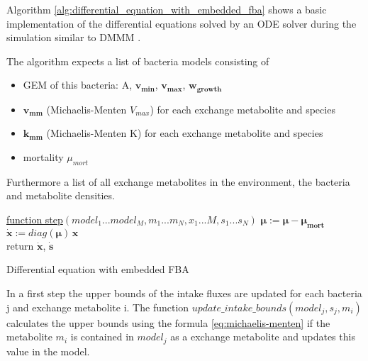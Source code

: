 Algorithm \ref{alg:differential_equation_with_embedded_fba} shows a basic implementation of the differential equations solved by an ODE
solver during the simulation similar to DMMM \cite{zhuang_genome-scale_2011}.

The algorithm expects a list of bacteria models consisting of
\begin{itemize}
 \item GEM of this bacteria: A, $\bm{v_{min}}$, $\bm{v_{max}}$, $\bm{w_{growth}}$
 \item $\bm{v_{mm}}$ (Michaelis-Menten $V_{max}$) for each exchange metabolite and species
 \item $\bm{k_{mm}}$ (Michaelis-Menten K) for each exchange metabolite and species
 \item mortality $\mu_{mort}$
\end{itemize}

Furthermore a list of all exchange metabolites in the environment, the bacteria and metabolite densities.


\begin{algorithm}

    \underline{function step}$(model_1...model_M, m_1...m_N, x_1...M, s_1...s_N)$\;
    $\bm{\mu} := \bm{\mu} - \bm{\mu_{mort}}$\\
    $\dot{\bm{x}} := diag(\bm{\mu}) \, \bm{x}$\\
    return $\dot{\bm{x}}$, $\dot{\bm{s}}$
    \caption{Differential equation with embedded FBA}
    \label{alg:differential_equation_with_embedded_fba}
\end{algorithm}

In a first step the upper bounds of the intake fluxes are updated for each bacteria j and exchange metabolite i.
The function $update\_intake\_bounds(model_j, s_j, m_i)$ calculates the upper bounds using the formula \ref{eq:michaelis-menten} if
the metabolite $m_i$ is contained in $model_j$ as a exchange metabolite and updates this value in the model.

